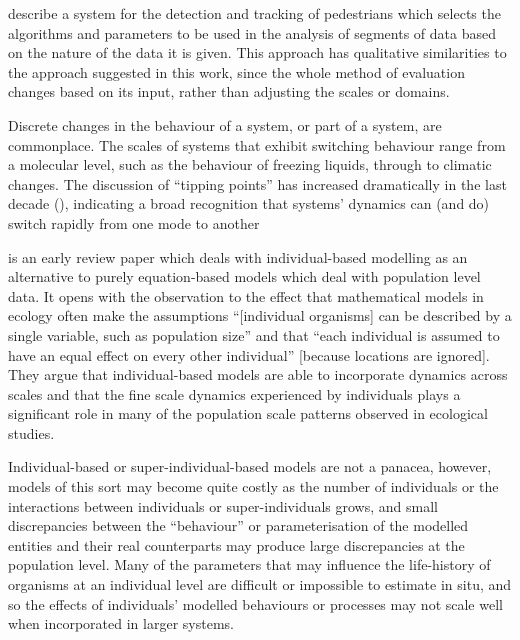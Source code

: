 \Cite{DBLP:ZhangZR16} describe a system for the
detection and tracking of pedestrians which selects the algorithms and
parameters to be used in the analysis of segments of data based on the
nature of the data it is given. This approach has qualitative
similarities to the approach suggested in this work, since the whole
method of evaluation changes based on its input, rather than 
adjusting the scales or domains.

Discrete changes in the behaviour of a system, or part of a system,
are commonplace. The scales of systems that exhibit switching
behaviour range from a molecular level, such as the behaviour of
freezing liquids, through to climatic changes.  The discussion of
``tipping points'' has increased dramatically in the last decade
(\citep{bhatanacharoentipping}), indicating a broad recognition that
systems' dynamics can (and do) switch rapidly from one mode to another

\Cite{huston1988new} is an early review paper which deals with
individual-based modelling as an alternative to purely equation-based
models which deal with population level data.  It opens with the
observation to the effect that mathematical models in ecology often
make the assumptions ``[individual organisms] can be described by a
single variable, such as population size'' and that ``each individual
is assumed to have an equal effect on every other individual''
[because locations are ignored]. They argue that individual-based
models are able to incorporate dynamics across scales and that the
fine scale dynamics experienced by individuals plays a significant
role in many of the population scale patterns observed in ecological
studies. 

Individual-based or super-individual-based models are not a panacea,
however, models of this sort may become quite costly as the number of
individuals or the interactions between individuals or
super-individuals grows, and small discrepancies between the
``behaviour'' or parameterisation of the modelled entities and their
real counterparts may produce large discrepancies at the population
level. Many of the parameters that may influence the life-history of
organisms at an individual level are difficult or impossible to
estimate in situ, and so the effects of individuals' modelled
behaviours or processes may not scale well when incorporated in
larger systems.


